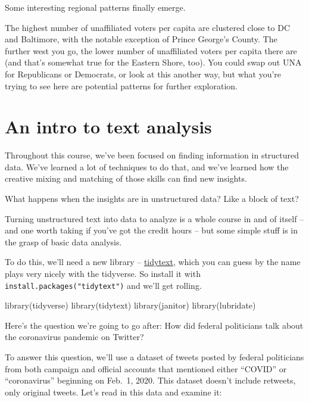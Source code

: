 \documentclass[
  letterpaper,
  DIV=11,
  numbers=noendperiod]{scrreprt}
\newenvironment{Shaded}{\begin{snugshade}}{\end{snugshade}}
\newcommand{\FunctionTok}[1]{\textcolor[rgb]{0.28,0.35,0.67}{#1}}
\newcommand{\NormalTok}[1]{\textcolor[rgb]{0.00,0.23,0.31}{#1}}
\begin{document}
Some interesting regional patterns finally emerge.

The highest number of unaffiliated voters per capita are clustered close
to DC and Baltimore, with the notable exception of Prince George's
County. The further west you go, the lower number of unaffiliated voters
per capita there are (and that's somewhat true for the Eastern Shore,
too). You could swap out UNA for Republicans or Democrats, or look at
this another way, but what you're trying to see here are potential
patterns for further exploration.


\hypertarget{an-intro-to-text-analysis}{%
\chapter{An intro to text analysis}\label{an-intro-to-text-analysis}}

Throughout this course, we've been focused on finding information in
structured data. We've learned a lot of techniques to do that, and we've
learned how the creative mixing and matching of those skills can find
new insights.

What happens when the insights are in unstructured data? Like a block of
text?

Turning unstructured text into data to analyze is a whole course in and
of itself -- and one worth taking if you've got the credit hours -- but
some simple stuff is in the grasp of basic data analysis.

To do this, we'll need a new library --
\href{https://cran.r-project.org/web/packages/tidytext/vignettes/tidytext.html}{tidytext},
which you can guess by the name plays very nicely with the tidyverse. So
install it with \texttt{install.packages("tidytext")} and we'll get
rolling.

\begin{Shaded}
\begin{Highlighting}[]
\FunctionTok{library}\NormalTok{(tidyverse)}
\FunctionTok{library}\NormalTok{(tidytext)}
\FunctionTok{library}\NormalTok{(janitor)}
\FunctionTok{library}\NormalTok{(lubridate)}
\end{Highlighting}
\end{Shaded}

Here's the question we're going to go after: How did federal politicians
talk about the coronavirus pandemic on Twitter?

To answer this question, we'll use a dataset of tweets posted by federal
politicians from both campaign and official accounts that mentioned
either ``COVID'' or ``coronavirus'' beginning on Feb.~1, 2020. This
dataset doesn't include retweets, only original tweets. Let's read in
this data and examine it:
\end{document}
